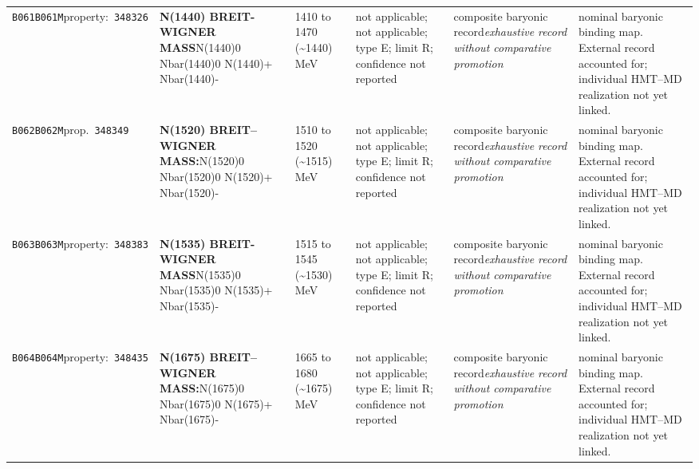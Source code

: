 \begin{landscape}
\begin{longtable}{L{1.85cm}L{4.45cm}L{2.35cm}L{4.05cm}L{3.35cm}L{7.15cm}}
\texttt{B061}\newline \texttt{B061M}\newline property:\ \texttt{348326} & \textbf{N(1440) BREIT-WIGNER MASS}\newline N(1440)0 \textbar{}\allowbreak{} Nbar(1440)0 \textbar{}\allowbreak{} N(1440)+ \textbar{}\allowbreak{} Nbar(1440)- & 1410 to 1470 (\textasciitilde{}1440)\,MeV & not applicable; not applicable; type E; limit R; confidence not reported & composite baryonic record\newline \emph{exhaustive record without comparative promotion} & nominal baryonic binding map. External record accounted for; individual HMT--MD realization not yet linked. \\
\texttt{B062}\newline \texttt{B062M}\newline prop.\ \texttt{348349} & \textbf{N(1520) BREIT--WIGNER MASS:}\newline N(1520)0 \textbar{}\allowbreak{} Nbar(1520)0 \textbar{}\allowbreak{} N(1520)+ \textbar{}\allowbreak{} Nbar(1520)- & 1510 to 1520 (\textasciitilde{}1515)\,MeV & not applicable; not applicable; type E; limit R; confidence not reported & composite baryonic record\newline \emph{exhaustive record without comparative promotion} & nominal baryonic binding map. External record accounted for; individual HMT--MD realization not yet linked. \\
\texttt{B063}\newline \texttt{B063M}\newline property:\ \texttt{348383} & \textbf{N(1535) BREIT-WIGNER MASS}\newline N(1535)0 \textbar{}\allowbreak{} Nbar(1535)0 \textbar{}\allowbreak{} N(1535)+ \textbar{}\allowbreak{} Nbar(1535)- & 1515 to 1545 (\textasciitilde{}1530)\,MeV & not applicable; not applicable; type E; limit R; confidence not reported & composite baryonic record\newline \emph{exhaustive record without comparative promotion} & nominal baryonic binding map. External record accounted for; individual HMT--MD realization not yet linked. \\
\texttt{B064}\newline \texttt{B064M}\newline property:\ \texttt{348435} & \textbf{N(1675) BREIT--WIGNER MASS:}\newline N(1675)0 \textbar{}\allowbreak{} Nbar(1675)0 \textbar{}\allowbreak{} N(1675)+ \textbar{}\allowbreak{} Nbar(1675)- & 1665 to 1680 (\textasciitilde{}1675)\,MeV & not applicable; not applicable; type E; limit R; confidence not reported & composite baryonic record\newline \emph{exhaustive record without comparative promotion} & nominal baryonic binding map. External record accounted for; individual HMT--MD realization not yet linked. \\

\end{longtable}
\end{landscape}
